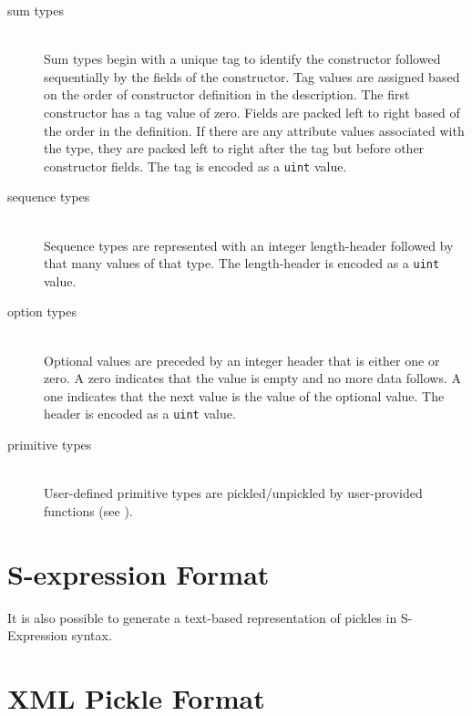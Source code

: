 \begin{description}
  \item[sum types] \mbox{}\\
    Sum types begin with a unique tag to identify the constructor
    followed sequentially by the fields of the constructor.
    Tag values are assigned based on the order of constructor definition in the
    description.
    The first constructor has a tag value of zero.
    Fields are packed left to right based of the order in the definition.
    If there are any attribute values associated with the type, they are packed left to right
    after the tag but before other constructor fields.
    The tag is encoded as a \lstinline!uint! value.

  \item[sequence types] \mbox{}\\
    Sequence types are represented with an integer length-header followed by
    that many values of that type.
    The length-header is encoded as a \lstinline!uint! value.

  \item[option types] \mbox{}\\
    Optional values are preceded by an integer header that is either one or zero.
    A zero indicates that the value is empty and no more data follows.
    A one indicates that the next value is the value of the optional value.
    The header is encoded as a \lstinline!uint! value.

  \item[primitive types] \mbox{}\\
    User-defined primitive types are pickled/unpickled by user-provided functions (see
    ).
\end{description}%

\section{S-expression Format}
It is also possible to generate a text-based representation of pickles in S-Expression
syntax.


\section{XML Pickle Format}

